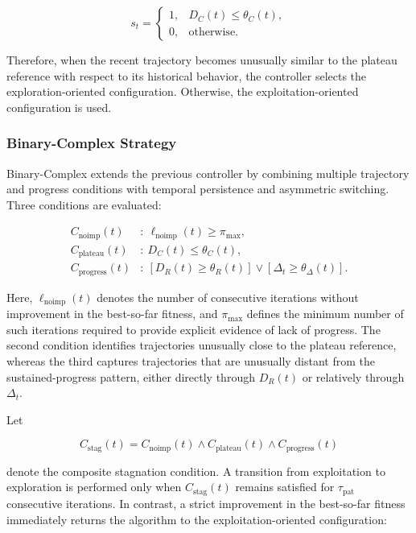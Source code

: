 \documentclass[journal,article,submit,moreauthors]{Definitions/mdpi}
\begin{document}
\begin{equation}
s_t =
\begin{cases}
1, & D_C(t) \leq \theta_C(t),\\
0, & \text{otherwise}.
\end{cases}
\label{eq:binary_simple}
\end{equation}

Therefore, when the recent trajectory becomes unusually similar to the
plateau reference with respect to its historical behavior, the controller
selects the exploration-oriented configuration. Otherwise, the
exploitation-oriented configuration is used.


\subsubsection{Binary-Complex Strategy}

Binary-Complex extends the previous controller by combining multiple
trajectory and progress conditions with temporal persistence and asymmetric
switching. Three conditions are evaluated:

\begin{align}
C_{\mathrm{noimp}}(t) &:\
\ell_{\mathrm{noimp}}(t) \geq \pi_{\max},
\label{eq:cond_noimp}\\
C_{\mathrm{plateau}}(t) &:\
D_C(t) \leq \theta_C(t),
\label{eq:cond_plateau}\\
C_{\mathrm{progress}}(t) &:\
\left[D_R(t) \geq \theta_R(t)\right]
\lor
\left[\Delta_t \geq \theta_{\Delta}(t)\right].
\label{eq:cond_progress}
\end{align}

Here, $\ell_{\mathrm{noimp}}(t)$ denotes the number of consecutive iterations
without improvement in the best-so-far fitness, and $\pi_{\max}$ defines the
minimum number of such iterations required to provide explicit evidence of
lack of progress. The second condition identifies trajectories unusually
close to the plateau reference, whereas the third captures trajectories that
are unusually distant from the sustained-progress pattern, either directly
through $D_R(t)$ or relatively through $\Delta_t$.

Let

\begin{equation}
C_{\mathrm{stag}}(t)
=
C_{\mathrm{noimp}}(t)
\land
C_{\mathrm{plateau}}(t)
\land
C_{\mathrm{progress}}(t)
\label{eq:composite_stagnation}
\end{equation}

denote the composite stagnation condition. A transition from exploitation
to exploration is performed only when $C_{\mathrm{stag}}(t)$ remains
satisfied for $\tau_{\mathrm{pat}}$ consecutive iterations. In contrast, a
strict improvement in the best-so-far fitness immediately returns the
algorithm to the exploitation-oriented configuration:
\end{document}
